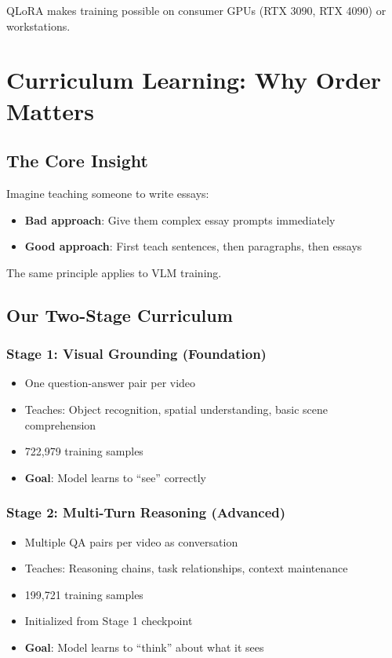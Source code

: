 \documentclass[11pt,a4paper]{article}
\begin{document}
QLoRA makes training possible on consumer GPUs (RTX 3090, RTX 4090) or workstations.

\section{Curriculum Learning: Why Order Matters}

\subsection{The Core Insight}

\begin{keyinsight}
Imagine teaching someone to write essays:
\begin{itemize}
    \item \textbf{Bad approach}: Give them complex essay prompts immediately
    \item \textbf{Good approach}: First teach sentences, then paragraphs, then essays
\end{itemize}
The same principle applies to VLM training.
\end{keyinsight}

\subsection{Our Two-Stage Curriculum}

\subsubsection{Stage 1: Visual Grounding (Foundation)}
\begin{itemize}
    \item One question-answer pair per video
    \item Teaches: Object recognition, spatial understanding, basic scene comprehension
    \item 722,979 training samples
    \item \textbf{Goal}: Model learns to ``see'' correctly
\end{itemize}

\subsubsection{Stage 2: Multi-Turn Reasoning (Advanced)}
\begin{itemize}
    \item Multiple QA pairs per video as conversation
    \item Teaches: Reasoning chains, task relationships, context maintenance
    \item 199,721 training samples
    \item Initialized from Stage 1 checkpoint
    \item \textbf{Goal}: Model learns to ``think'' about what it sees
\end{itemize}
\end{document}
